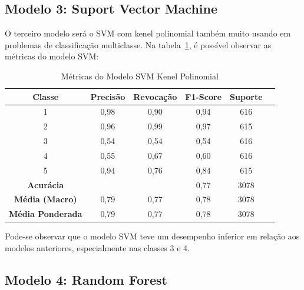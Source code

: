 \documentclass[12pt,oneside,a4paper,chapter=TITLE,
			   english,brazil]{abntex2}
\begin{document}
\vspace{\onelineskip}
\subsection{Modelo 3: Suport Vector Machine}
\vspace{\onelineskip}


O terceiro modelo será o SVM com kenel polinomial também muito usando em problemas de classificação multiclasse. Na tabela~\ref{tab:SVM}, é possível observar as métricas do modelo SVM: 


\begin{table}[H]
    \centering
    \caption[Métricas do Modelo SVM Kenel Polinomial]{Métricas do Modelo SVM Kenel Polinomial}
    \begin{tabular}{cccccc}
        \toprule
        \textbf{Classe} & \textbf{Precisão} & \textbf{Revocação} & \textbf{F1-Score} & \textbf{Suporte} \\
        \midrule
        1 & 0,98 & 0,90 & 0,94 & 616 \\
        2 & 0,96 & 0,99 & 0,97 & 615 \\
        3 & 0,54 & 0,54 & 0,54 & 616 \\
        4 & 0,55 & 0,67 & 0,60 & 616 \\
        5 & 0,94 & 0,76 & 0,84 & 615 \\
        \midrule
        \textbf{Acurácia} & & & 0,77 & 3078 \\
        \textbf{Média (Macro)} & 0,79 & 0,77 & 0,78 & 3078 \\
        \textbf{Média Ponderada} & 0,79 & 0,77 & 0,78 & 3078 \\
        \bottomrule
    \end{tabular}

    \label{tab:SVM}
\end{table}
 \begin{flushleft}
\vspace{-1.0em}
\centering
{}
\end{flushleft}


Pode-se observar que o modelo SVM teve um desempenho inferior em relação aos modelos anteriores, especialmente nas classes 3 e 4.

\vspace{\onelineskip}
\subsection{Modelo 4: Random Forest}
\vspace{\onelineskip}
\end{document}
